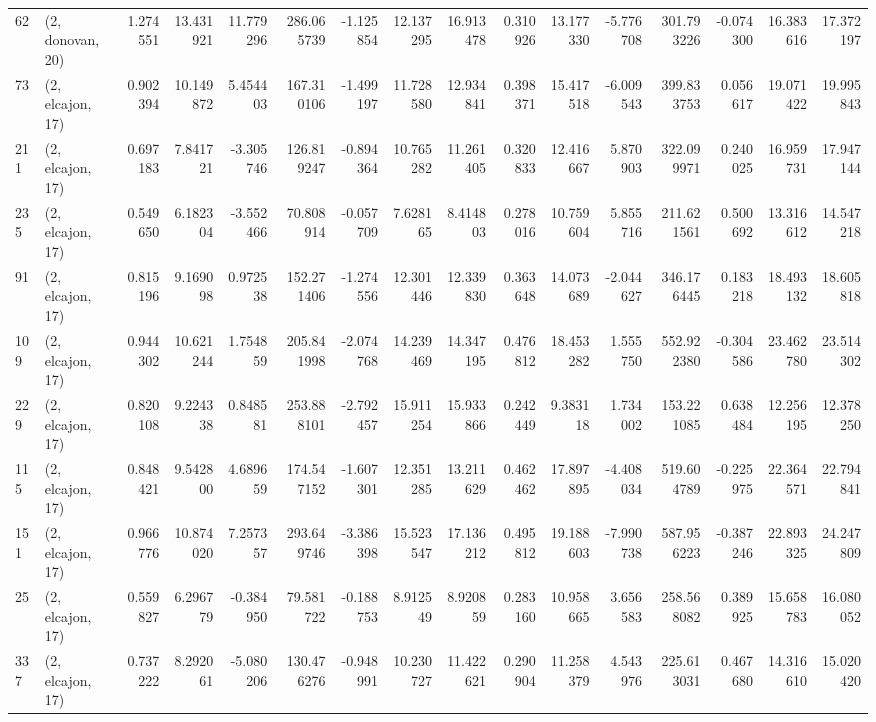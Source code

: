 \begin{tabular}{llrrrrrrrrrrrrrr}
62  &  (2, donovan, 20) &   1.274551 &  13.431921 &  11.779296 &   286.065739 &  -1.125854 &  12.137295 &  16.913478 &  0.310926 &  13.177330 &  -5.776708 &   301.793226 & -0.074300 &  16.383616 &  17.372197 \\
73  &  (2, elcajon, 17) &   0.902394 &  10.149872 &   5.454403 &   167.310106 &  -1.499197 &  11.728580 &  12.934841 &  0.398371 &  15.417518 &  -6.009543 &   399.833753 &  0.056617 &  19.071422 &  19.995843 \\
211 &  (2, elcajon, 17) &   0.697183 &   7.841721 &  -3.305746 &   126.819247 &  -0.894364 &  10.765282 &  11.261405 &  0.320833 &  12.416667 &   5.870903 &   322.099971 &  0.240025 &  16.959731 &  17.947144 \\
235 &  (2, elcajon, 17) &   0.549650 &   6.182304 &  -3.552466 &    70.808914 &  -0.057709 &   7.628165 &   8.414803 &  0.278016 &  10.759604 &   5.855716 &   211.621561 &  0.500692 &  13.316612 &  14.547218 \\
91  &  (2, elcajon, 17) &   0.815196 &   9.169098 &   0.972538 &   152.271406 &  -1.274556 &  12.301446 &  12.339830 &  0.363648 &  14.073689 &  -2.044627 &   346.176445 &  0.183218 &  18.493132 &  18.605818 \\
109 &  (2, elcajon, 17) &   0.944302 &  10.621244 &   1.754859 &   205.841998 &  -2.074768 &  14.239469 &  14.347195 &  0.476812 &  18.453282 &   1.555750 &   552.922380 & -0.304586 &  23.462780 &  23.514302 \\
229 &  (2, elcajon, 17) &   0.820108 &   9.224338 &   0.848581 &   253.888101 &  -2.792457 &  15.911254 &  15.933866 &  0.242449 &   9.383118 &   1.734002 &   153.221085 &  0.638484 &  12.256195 &  12.378250 \\
115 &  (2, elcajon, 17) &   0.848421 &   9.542800 &   4.689659 &   174.547152 &  -1.607301 &  12.351285 &  13.211629 &  0.462462 &  17.897895 &  -4.408034 &   519.604789 & -0.225975 &  22.364571 &  22.794841 \\
151 &  (2, elcajon, 17) &   0.966776 &  10.874020 &   7.257357 &   293.649746 &  -3.386398 &  15.523547 &  17.136212 &  0.495812 &  19.188603 &  -7.990738 &   587.956223 & -0.387246 &  22.893325 &  24.247809 \\
25  &  (2, elcajon, 17) &   0.559827 &   6.296779 &  -0.384950 &    79.581722 &  -0.188753 &   8.912549 &   8.920859 &  0.283160 &  10.958665 &   3.656583 &   258.568082 &  0.389925 &  15.658783 &  16.080052 \\
337 &  (2, elcajon, 17) &   0.737222 &   8.292061 &  -5.080206 &   130.476276 &  -0.948991 &  10.230727 &  11.422621 &  0.290904 &  11.258379 &   4.543976 &   225.613031 &  0.467680 &  14.316610 &  15.020420 \\

\end{tabular}

